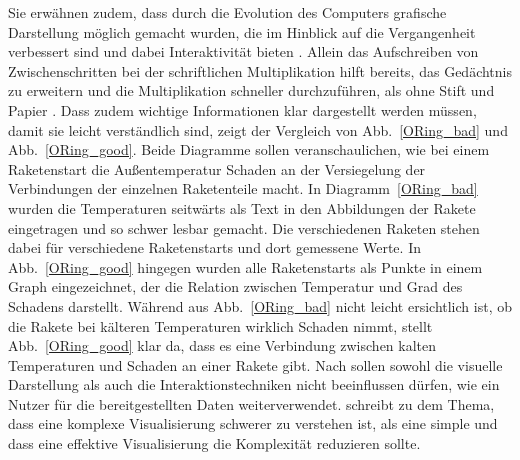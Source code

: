 \documentclass[12pt, a4paper]{article}
\begin{document}
Sie erwähnen zudem, dass durch die Evolution des Computers grafische Darstellung möglich gemacht wurden, die im Hinblick auf die Vergangenheit verbessert sind und dabei Interaktivität bieten \cite[S.~1]{card1999readings}. Allein das Aufschreiben von Zwischenschritten bei der schriftlichen Multiplikation hilft bereits, das Gedächtnis zu erweitern und die Multiplikation schneller durchzuführen, als ohne Stift und Papier \cite[S.~2]{card1999readings}. Dass zudem wichtige Informationen klar dargestellt werden müssen, damit sie leicht verständlich sind, zeigt der Vergleich von Abb.~\ref{ORing_bad} und Abb.~\ref{ORing_good}. Beide Diagramme sollen veranschaulichen, wie bei einem Raketenstart die Außentemperatur Schaden an der Versiegelung der Verbindungen der einzelnen Raketenteile macht. In Diagramm~\ref{ORing_bad} wurden die Temperaturen seitwärts als Text in den Abbildungen der Rakete eingetragen und so schwer lesbar gemacht. Die verschiedenen Raketen stehen dabei für verschiedene Raketenstarts und dort gemessene Werte. In Abb.~\ref{ORing_good} hingegen wurden alle Raketenstarts als Punkte in einem Graph eingezeichnet, der die Relation zwischen Temperatur und Grad des Schadens darstellt. Während aus Abb.~\ref{ORing_bad} nicht leicht ersichtlich ist, ob die Rakete bei kälteren Temperaturen wirklich Schaden nimmt, stellt Abb.~\ref{ORing_good} klar da, dass es eine Verbindung zwischen kalten Temperaturen und Schaden an einer Rakete gibt. Nach  sollen sowohl die visuelle Darstellung als auch die Interaktionstechniken nicht beeinflussen dürfen, wie ein Nutzer für die bereitgestellten Daten weiterverwendet.  schreibt zu dem Thema, dass eine komplexe Visualisierung schwerer zu verstehen ist, als eine simple und dass eine effektive Visualisierung die Komplexität reduzieren sollte.\\
\end{document}

